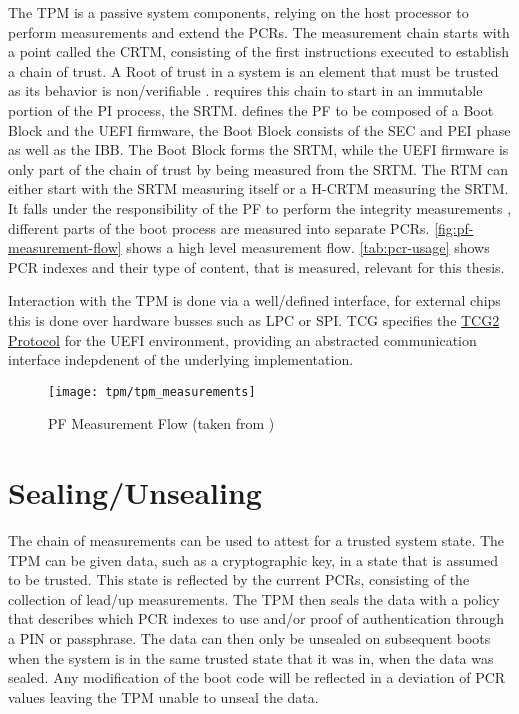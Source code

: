 The \ac{TPM} is a passive system components, relying on the host processor to perform measurements and extend the \acp{PCR}.
The measurement chain starts with a point called the \ac{CRTM}, consisting of the first instructions executed to establish a chain of trust.
A Root of trust in a system is an element that must be trusted as its behavior is non\-/verifiable \cite{tcg-tpm-library-part1-architecture}.
\cite[3.2.2]{tcg-pc-client-platform-firmware-profile-spec} requires this chain to start in an immutable portion of the \ac{PI} process, the \ac{SRTM}.
\cite[3.2.3.1]{tcg-pc-client-platform-firmware-profile-spec} defines the \ac{PF} to be composed of a Boot Block and the \ac{UEFI} firmware, the Boot Block consists of the \ac{SEC} and \ac{PEI} phase as well as the \ac{IBB}.
The Boot Block forms the \ac{SRTM}, while the \ac{UEFI} firmware is only part of the chain of trust by being measured from the \ac{SRTM}.
The \ac{RTM} can either start with the \ac{SRTM} measuring itself or a \ac{H-CRTM} measuring the \ac{SRTM}.
It falls under the responsibility of the \ac{PF} to perform the integrity measurements \cite{tcg-pc-client-platform-firmware-profile-spec}, different parts of the boot process are measured into separate \acp{PCR}.
\autoref{fig:pf-measurement-flow} shows a high level measurement flow.
\autoref{tab:pcr-usage} shows \ac{PCR} indexes and their type of content, that is measured, relevant for this thesis.

Interaction with the \ac{TPM} is done via a well\-/defined interface, for external chips this is done over hardware busses such as \ac{LPC} or \ac{SPI}.
\ac{TCG} specifies the \hyperref[lst:tcg2-protocol]{\ac{TCG}2 Protocol} for the \ac{UEFI} environment, providing an abstracted communication interface indepdenent of the underlying implementation.

\begin{figure}[htb]
    \centering
    \texttt{[image: tpm/tpm\_measurements]}
    \caption{\ac{PF} Measurement Flow (taken from \cite[Figure 3]{tianocore-trusted-boot-chain})}
    \label{fig:pf-measurement-flow}
\end{figure}



\section{Sealing/Unsealing}

The chain of measurements can be used to attest for a trusted system state.
The \ac{TPM} can be given data, such as a cryptographic key, in a state that is assumed to be trusted.
This state is reflected by the current \acp{PCR}, consisting of the collection of lead\-/up measurements.
The \ac{TPM} then seals the data with a policy that describes which \ac{PCR} indexes to use and/or proof of authentication through a \ac{PIN} or passphrase.
The data can then only be unsealed on subsequent boots when the system is in the same trusted state that it was in, when the data was sealed.
Any modification of the boot code will be reflected in a deviation of \ac{PCR} values leaving the \ac{TPM} unable to unseal the data.

